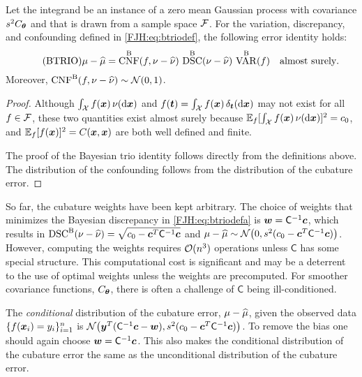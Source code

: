 \documentclass[graybox,footinfo]{svmult}
\DeclareMathOperator{\algn}{CNF}
\DeclareMathOperator{\disc}{DSC}
\DeclareMathOperator{\Var}{VAR}
\begin{document}
\begin{theorem}  \label{FJH:thm:btrio} Let the integrand be 
an instance of a zero mean Gaussian process with covariance $s^2C_{{\boldsymbol{\theta}}}$ and 
that is drawn from a sample space 
${\mathcal{F}}$.  For the  variation, discrepancy, and 
	confounding defined in \eqref{FJH:eq:btriodef}, the following error identity holds: 
	\begin{equation} \tag{BTRIO} \label{FJH:eq:btrio}
	\mu - \hmu  = \algn^\Ba(f,\nu - \hnu) \, \disc^\Ba(\nu - \hnu) \, \Var^{\Ba}(f) \quad 
	\text{almost surely}.
	\end{equation}
	Moreover, $\algn^\Ba(f,\nu - \hnu) \sim \cn(0,1)$. 
\end{theorem}
\begin{proof}  Although $\int_{\mathcal{X}} f({\boldsymbol{x}}) \, \nu(\mathrm{d} {\boldsymbol{x}})$ and $f({\boldsymbol{t}}) = \int_{\mathcal{X}} 
f({\boldsymbol{x}}) \, \delta_{\boldsymbol{t}} (\mathrm{d} {\boldsymbol{x}})$ may not exist for all $f \in \mathcal{F}$, these two quantities exist 
almost surely because ${\mathbb{E}}_f [\int_{\mathcal{X}} f({\boldsymbol{x}}) \, \nu(\mathrm{d} {\boldsymbol{x}})]^2 = c_0$, and 
${\mathbb{E}}_f [f({\boldsymbol{x}})]^2 = C({\boldsymbol{x}},{\boldsymbol{x}})$ are both well defined and finite.

The proof of the Bayesian trio identity follows directly from the definitions above.  The 
distribution of the confounding follows from the distribution of the cubature error.
\end{proof}

So far, the cubature weights have been kept arbitrary.  The choice of weights that 
minimizes the Bayesian discrepancy in \eqref{FJH:eq:btriodefa} is ${\boldsymbol{w}} = 
\mathsf{C}^{-1} {\boldsymbol{c}}$, which results in $\disc^{\Ba}(\nu - \hnu) = \sqrt{c_0 - \bsc ^T 
\mC^{-1} \bsc}$ and $\mu - \widehat{\mu} \sim \mathcal{N} \bigl(0 , s^2(c_0 - {\boldsymbol{c}} ^T 
\mathsf{C}^{-1} {\boldsymbol{c}}) \bigr)$.  However, computing the weights requires $\mathcal{O}(n^3)$ 
operations 
unless $\mathsf{C}$ has some special structure.  This computational cost is significant 
and may be a deterrent to the use of optimal weights unless the weights are 
precomputed. For smoother covariance functions, $C_{\boldsymbol{\theta}}$, there is often a 
challenge of $\mathsf{C}$ being ill-conditioned.

The \emph{conditional} distribution of the cubature error, $\mu - \widehat{\mu}$, given the 
observed data $ \{f({\boldsymbol{x}}_i )= y_i\}_{i=1}^n$ is $\mathcal{N} \bigl( {\boldsymbol{y}}^T (\mathsf{C}^{-1}{\boldsymbol{c}} - 
{\boldsymbol{w}}) , s^2(c_0 - {\boldsymbol{c}} ^T \mathsf{C}^{-1} {\boldsymbol{c}}) \bigr)$.  To remove the bias one should again 
choose ${\boldsymbol{w}} = \mathsf{C}^{-1} {\boldsymbol{c}}$.  This also makes the conditional distribution of 
the cubature error the same as the unconditional distribution of the cubature error.
\end{document}
